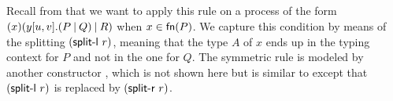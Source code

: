 \begin{AgdaAlign}
\begin{code}
\AgdaSpace{}%
\AgdaOperator{\AgdaInductiveConstructor{,}}\AgdaSpace{}%
\AgdaSpace{}%
\AgdaSymbol{=}\AgdaSpace{}%
\AgdaSpace{}%
\AgdaSpace{}%
\AgdaSpace{}%
\<%
\\
%
\>[4]\AgdaSpace{}%
\AgdaSymbol{\AgdaUnderscore{}}\AgdaSpace{}%
\AgdaOperator{\AgdaInductiveConstructor{,}}\AgdaSpace{}%
\AgdaSpace{}%
\AgdaOperator{\AgdaInductiveConstructor{,}}\AgdaSpace{}%
\AgdaSpace{}%
\AgdaSymbol{=}\AgdaSpace{}%
\AgdaSpace{}%
\AgdaSpace{}%
\AgdaSpace{}%
\<%
\\
%
\>[4]\AgdaSpace{}%
\AgdaSymbol{\AgdaUnderscore{}}\AgdaSpace{}%
\AgdaOperator{\AgdaInductiveConstructor{,}}\AgdaSpace{}%
\AgdaSpace{}%
\AgdaOperator{\AgdaInductiveConstructor{,}}\AgdaSpace{}%
\AgdaSpace{}%
\AgdaSymbol{=}\AgdaSpace{}%
\AgdaSpace{}%
\AgdaSpace{}%
\AgdaSymbol{(}\AgdaSpace{}%
\AgdaSymbol{)}\AgdaSpace{}%
\<%
\\
%
\>[4]\AgdaSpace{}%
\AgdaSpace{}%
\AgdaSpace{}%
\AgdaSymbol{(}\AgdaSpace{}%
\AgdaSymbol{(}\AgdaSpace{}%
\AgdaSymbol{)}\AgdaSpace{}%
\AgdaSymbol{(}\AgdaSpace{}%
\AgdaSymbol{)}\AgdaSpace{}%
\AgdaSpace{}%
\AgdaSymbol{)}\AgdaSpace{}%
\AgdaSpace{}%
\<%
\\
%
\>[4]\AgdaSpace{}%
\AgdaSpace{}%
\AgdaSpace{}%
\AgdaSymbol{(}\AgdaSpace{}%
\AgdaSpace{}%
\AgdaSymbol{(}\AgdaSpace{}%
\AgdaSymbol{)}\AgdaSpace{}%
\AgdaSymbol{(}\AgdaSpace{}%
\AgdaSpace{}%
\AgdaSymbol{)}\AgdaSpace{}%
\AgdaSymbol{)}\AgdaSpace{}%
\<%
\end{code}

Recall from  that we want to apply this rule on a process of
the form $\Cut\x{\Fork\y\u\v{P}{Q}}{R}$ when $x \in \mathsf{fn}(P)$. We capture this
condition by means of the splitting $(\AgdaInductiveConstructor{split-l}~r)$,
meaning that the type $A$ of $x$ ends up in the typing context for $P$ and not
in the one for $Q$.
%
The symmetric rule \SForkR is modeled by another constructor
, which is not shown here but is similar to
 except that
$(\AgdaInductiveConstructor{split-l}~r)$ is replaced by
$(\AgdaInductiveConstructor{split-r}~r)$.


\end{AgdaAlign}
